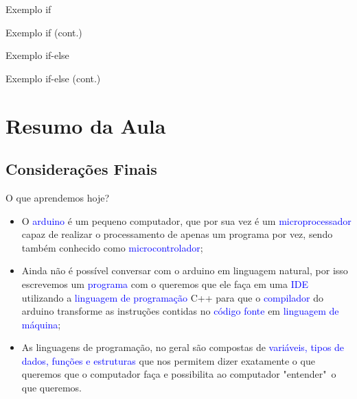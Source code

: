 \begin{frame}{Exemplo if}
	
\end{frame}

\begin{frame}{Exemplo if (cont.)}
	
\end{frame}

\begin{frame}{Exemplo if-else}
	
\end{frame}

\begin{frame}{Exemplo if-else (cont.)}
	
\end{frame}

\section{Resumo da Aula}
\subsection*{Considerações Finais}
\begin{frame}{O que aprendemos hoje?}
	\begin{itemize}
		\item O \textcolor{blue}{arduino} é um pequeno computador, que por sua vez é um \textcolor{blue}{microprocessador} capaz de realizar o processamento de apenas um programa por vez, sendo também conhecido como \textcolor{blue}{microcontrolador};
		\item Ainda não é possível conversar com o arduino em linguagem natural, por isso escrevemos um \textcolor{blue}{programa} com o queremos que ele faça em uma \textcolor{blue}{IDE} utilizando a \textcolor{blue}{linguagem de programação} C++ para que o \textcolor{blue}{compilador} do arduino transforme as instruções contidas no \textcolor{blue}{código fonte} em \textcolor{blue}{linguagem de máquina};
		\item As linguagens de programação, no geral são compostas de \textcolor{blue}{variáveis, tipos de dados, funções e estruturas} que nos permitem dizer exatamente o que queremos que o computador faça e possibilita ao computador "entender"~o que queremos.
	\end{itemize}
\end{frame}

